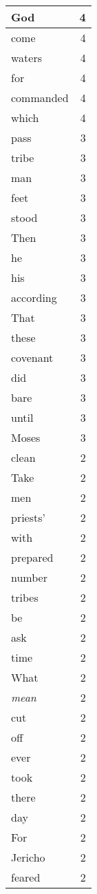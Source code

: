 \begin{center}
\begin{longtable}{l|r}
God & 4\\ \hline 
come & 4\\ \hline 
waters & 4\\ \hline 
for & 4\\ \hline 
commanded & 4\\ \hline 
which & 4\\ \hline 
pass & 3\\ \hline 
tribe & 3\\ \hline 
man & 3\\ \hline 
feet & 3\\ \hline 
stood & 3\\ \hline 
Then & 3\\ \hline 
he & 3\\ \hline 
his & 3\\ \hline 
according & 3\\ \hline 
That & 3\\ \hline 
these & 3\\ \hline 
covenant & 3\\ \hline 
did & 3\\ \hline 
bare & 3\\ \hline 
until & 3\\ \hline 
Moses & 3\\ \hline 
clean & 2\\ \hline 
Take & 2\\ \hline 
men & 2\\ \hline 
priests' & 2\\ \hline 
with & 2\\ \hline 
prepared & 2\\ \hline 
number & 2\\ \hline 
tribes & 2\\ \hline 
be & 2\\ \hline 
ask & 2\\ \hline 
time & 2\\ \hline 
What & 2\\ \hline 
\emph{mean} & 2\\ \hline 
cut & 2\\ \hline 
off & 2\\ \hline 
ever & 2\\ \hline 
took & 2\\ \hline 
there & 2\\ \hline 
day & 2\\ \hline 
For & 2\\ \hline 
Jericho & 2\\ \hline 
feared & 2\\ \hline 

\end{longtable}
\end{center}
